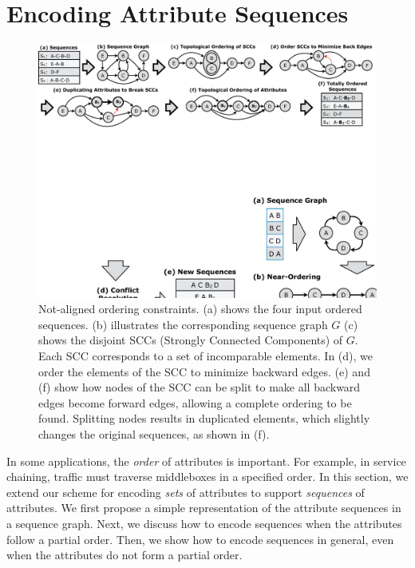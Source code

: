 \section{Encoding Attribute Sequences}
\label{sec:ordering}


\begin{figure}[t!]
\includegraphics[trim={0 18cm 0 0}, clip, width=\textwidth]{figures/partial_ordering2}
\caption{Not-aligned ordering constraints. (a) shows the four input ordered sequences. (b) illustrates the corresponding sequence graph $G$ (c) shows the disjoint SCCs  (Strongly Connected Components) of $G$. Each SCC corresponds to a set of incomparable elements. In (d), we order the elements of the SCC to minimize backward edges. (e) and (f) show how nodes of the SCC can be split to make all backward edges become forward edges, allowing a complete ordering to be found. Splitting nodes results in duplicated elements, which slightly changes the original sequences, as shown in (f).}
\label{fig:ordering}
\end{figure}

In some applications, the \emph{order} of attributes is important.  For example, in service chaining, traffic must traverse middleboxes in a specified order.  In this section, we extend our scheme for encoding \emph{sets} of attributes to support \textit{sequences} of attributes.  We first propose a simple representation of the attribute sequences in a sequence graph.  Next, we discuss how to encode sequences when the attributes follow a partial order.  Then, we show how to encode sequences in general, even when the attributes do not form a partial order.

